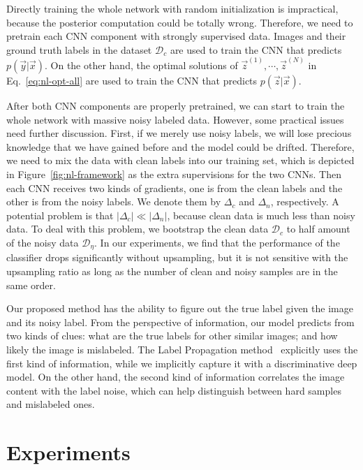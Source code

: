 Directly training the whole network with random initialization is impractical, because the posterior computation could be totally wrong. Therefore, we need to pretrain each CNN component with strongly supervised data. Images and their ground truth labels in the dataset $\mathcal{D}_c$ are used to train the CNN that predicts $p(\vec{y}|\vec{x})$. On the other hand, the optimal solutions of $\vec{z}^{(1)},\cdots,\vec{z}^{(N)}$ in Eq.~\eqref{eq:nl-opt-all} are used to train the CNN that predicts $p(\vec{z}|\vec{x})$.

After both CNN components are properly pretrained, we can start to train the whole network with massive noisy labeled data. However, some practical issues need further discussion. First, if we merely use noisy labels, we will lose precious knowledge that we have gained before and the model could be drifted. Therefore, we need to mix the data with clean labels into our training set, which is depicted in Figure~\ref{fig:nl-framework} as the extra supervisions for the two CNNs. Then each CNN receives two kinds of gradients, one is from the clean labels and the other is from the noisy labels. We denote them by $\Delta_c$ and $\Delta_n$, respectively. A potential problem is that $|\Delta_c| \ll |\Delta_n|$, because clean data is much less than noisy data. To deal with this problem, we bootstrap the clean data $\mathcal{D}_c$ to half amount of the noisy data $\mathcal{D}_{\eta}$. In our experiments, we find that the performance of the classifier drops significantly without upsampling, but it is not sensitive with the upsampling ratio as long as the number of clean and noisy samples are in the same order.

Our proposed method has the ability to figure out the true label given the image and its noisy label. From the perspective of information, our model predicts from two kinds of clues: what are the true labels for other similar images; and how likely the image is mislabeled. The Label Propagation method~\cite{zhu2002learning} explicitly uses the first kind of information, while we implicitly capture it with a discriminative deep model. On the other hand, the second kind of information correlates the image content with the label noise, which can help distinguish between hard samples and mislabeled ones.

\section{Experiments} %
\label{sec:nl-experiments}

